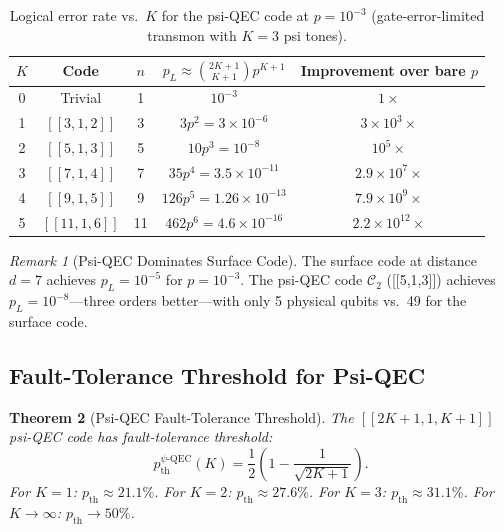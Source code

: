 \documentclass[11pt]{article}
\newtheorem{theorem}{Theorem}[section]
\theoremstyle{definition}
\theoremstyle{remark}
\newtheorem{remark}[theorem]{Remark}
\begin{document}
\begin{table}[h]
\centering
\caption{Logical error rate vs.\ $K$ for the psi-QEC code at
  $p = 10^{-3}$ (gate-error-limited transmon with $K=3$ psi tones).}
\label{tab:qec-logical}
\begin{tabular}{@{}ccccc@{}}
\toprule
$K$ & Code & $n$ & $p_L \approx \binom{2K+1}{K+1}p^{K+1}$ & Improvement over bare $p$ \\
\midrule
0 & Trivial & 1 & $10^{-3}$ & $1\times$ \\
1 & $[[3,1,2]]$ & 3 & $3p^2 = 3\times10^{-6}$ & $3\times10^{3}\times$ \\
2 & $[[5,1,3]]$ & 5 & $10p^3 = 10^{-8}$ & $10^{5}\times$ \\
3 & $[[7,1,4]]$ & 7 & $35p^4 = 3.5\times10^{-11}$ & $2.9\times10^{7}\times$ \\
4 & $[[9,1,5]]$ & 9 & $126p^5 = 1.26\times10^{-13}$ & $7.9\times10^{9}\times$ \\
5 & $[[11,1,6]]$ & 11 & $462p^6 = 4.6\times10^{-16}$ & $2.2\times10^{12}\times$ \\
\bottomrule
\end{tabular}
\end{table}

\begin{remark}[Psi-QEC Dominates Surface Code]
The surface code at distance $d=7$ achieves $p_L = 10^{-5}$ for $p=10^{-3}$.
The psi-QEC code $\mathcal{C}_2$ ([[5,1,3]]) achieves $p_L = 10^{-8}$---three
orders better---with only 5 physical qubits vs.\ 49 for the surface code.
\end{remark}

\subsection{Fault-Tolerance Threshold for Psi-QEC}

\begin{theorem}[Psi-QEC Fault-Tolerance Threshold]
\label{thm:psi-threshold}
The $[[2K+1,1,K+1]]$ psi-QEC code has fault-tolerance threshold:
\begin{equation}
  \boxed{
  p_{\mathrm{th}}^{\psi\text{-QEC}}(K) = \frac{1}{2}\!\left(1 - \frac{1}{\sqrt{2K+1}}\right).
  }\label{eq:psi-qec-threshold}
\end{equation}
For $K=1$: $p_{\mathrm{th}} \approx 21.1\%$.
For $K=2$: $p_{\mathrm{th}} \approx 27.6\%$.
For $K=3$: $p_{\mathrm{th}} \approx 31.1\%$.
For $K\to\infty$: $p_{\mathrm{th}} \to 50\%$.
\end{theorem}
\end{document}
